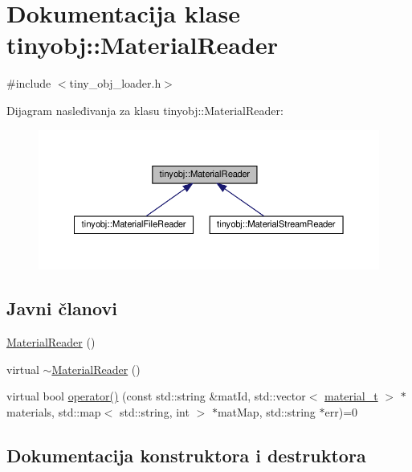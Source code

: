 \hypertarget{classtinyobj_1_1MaterialReader}{}\section{Dokumentacija klase tinyobj\+:\+:Material\+Reader}
\label{classtinyobj_1_1MaterialReader}


{\ttfamily \#include $<$tiny\+\_\+obj\+\_\+loader.\+h$>$}



Dijagram nasleđivanja za klasu tinyobj\+:\+:Material\+Reader\+:
\nopagebreak
\begin{figure}[H]
\begin{center}
\leavevmode
\includegraphics[width=350pt]{classtinyobj_1_1MaterialReader__inherit__graph}
\end{center}
\end{figure}
\subsection*{Javni članovi}
\begin{DoxyCompactItemize}
\item 
\hyperlink{classtinyobj_1_1MaterialReader_a701bdd6217518e0afb5596fcb59925b6}{Material\+Reader} ()
\item 
virtual \hyperlink{classtinyobj_1_1MaterialReader_afd62ceccd9b373801226e037ea1a5f9f}{$\sim$\+Material\+Reader} ()
\item 
virtual bool \hyperlink{classtinyobj_1_1MaterialReader_ad165d8cc1bd989f8548a9258b0881a89}{operator()} (const std\+::string \&mat\+Id, std\+::vector$<$ \hyperlink{structtinyobj_1_1material__t}{material\+\_\+t} $>$ $\ast$materials, std\+::map$<$ std\+::string, int $>$ $\ast$mat\+Map, std\+::string $\ast$err)=0
\end{DoxyCompactItemize}


\subsection{Dokumentacija konstruktora i destruktora}
\mbox{\label{classtinyobj_1_1MaterialReader_a701bdd6217518e0afb5596fcb59925b6}} 
